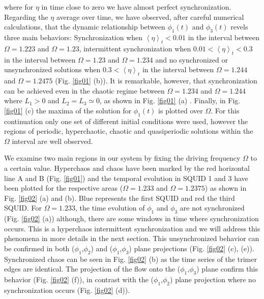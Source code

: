 \documentclass[aps,pre,reprint,groupedaddress]{revtex4-1}
\begin{document}
where for $\eta$ in time close to zero we have almost perfect synchronization. Regarding the $\eta$ average over time, we have observed, after careful numerical calculations, that the dynamic relationship between $\phi_{1}(t)$ and $\phi_{3}(t)$ revels three main behaviors: Synchronization when $\left\langle \eta\right\rangle _{t} < 0.01$ in the interval between $\Omega=1.223$ and $\Omega=1.23$, intermittent synchronization when $0.01<\left\langle \eta\right\rangle _{t} < 0.3$ in the interval between $\Omega=1.23$ and $\Omega=1.234$ and no synchronized or unsynchronized solutions when $0.3 < \left\langle \eta\right\rangle _{t}$ in the interval between $\Omega=1.244$ and $\Omega=1.2475$ (Fig. \ref{fig01} (b)). It is remarkable, however, that synchronization can be achieved even in the chaotic regime between $\Omega=1.234$ and $\Omega=1.244$ where $L_{1}>0$ and $L_{2} = L_{3} \simeq 0$, as shown in Fig. \ref{fig01} (a) .
Finally, in Fig. \ref{fig01} (c) the maxima of the solution for $\phi_{1}(t)$ is plotted over $\Omega$. For this continuation only one set of different initial conditions were used, however the regions of periodic, hyperchaotic, chaotic and quasiperiodic solutions within the $\Omega$ interval are well observed.

We examine two main regions in our system by fixing the driving frequency $\Omega$
to a certain value. Hyperchaos and chaos have been marked by the red horizontal
line A and B (Fig. \ref{fig01}) and the temporal evolution in SQUID 1 and 3 have been plotted for the respective areas ($\Omega = 1.233$ and $\Omega = 1.2375$)  as shown in Fig. \ref{fig02} (a) and (b). Blue represents the first SQUID and red the third SQUID. For $\Omega = 1.233$, the time evolution of $\phi_{1}$ and $\phi_{3}$ are not synchronized (Fig. \ref{fig02} (a)) although, there are some windows in time where synchronization occurs. This is a hyperchaos intermittent synchronization and we will address this phenomena in more details in the next section. This unsynchronized behavior can be confirmed in both ($\phi_{1}$,$\phi_{2}$) and ($\phi_{1}$,$\phi_{3}$) plane projections (Fig. \ref{fig02} (c), (e)). Synchronized chaos can be seen in Fig. \ref{fig02} (b) as the time series of the trimer edges are identical. The projection of the flow onto the ($\phi_{1}$,$\phi_{3}$) plane confirm this behavior (Fig. \ref{fig02} (f)), in contrast with the ($\phi_{1}$,$\phi_{2}$) plane projection where no synchronization occurs (Fig. \ref{fig02} (d)).  
\end{document}
